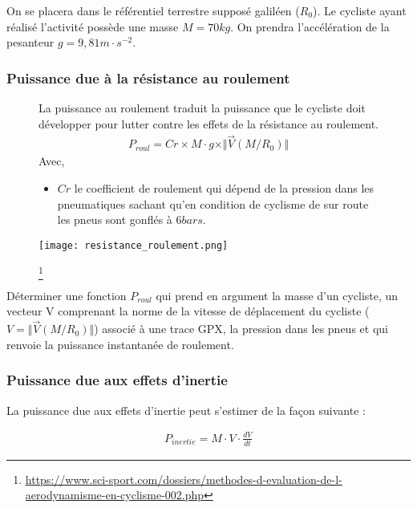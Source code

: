 On se placera dans le référentiel terrestre supposé galiléen ($R_0$). Le cycliste ayant réalisé l'activité possède une masse $M=70kg$. On prendra l'accélération de la pesanteur $g=9,81m\cdot s^{-2}$.

\subsubsection*{Puissance due à la résistance au roulement}

\begin{figure}[!htb]
\begin{minipage}{0.5\textwidth}
La puissance au roulement traduit la puissance que le cycliste doit développer pour lutter contre les effets de la résistance au roulement.
\begin{align*}
P_{roul}=Cr\times M\cdot g\times \Vert \overrightarrow{V}(M/R_0)\Vert
\end{align*}
Avec,
\begin{itemize}
\item $Cr$ le coefficient de roulement qui dépend de la pression dans les pneumatiques sachant qu'en condition de cyclisme de sur route les pneus sont gonflés à $6bars$.
\end{itemize}
\end{minipage}
\begin{minipage}{0.5\textwidth}
\begin{center}
\texttt{[image: resistance\_roulement.png]}
\caption{\label{res_roul}}
\footnote{\url{https://www.sci-sport.com/dossiers/methodes-d-evaluation-de-l-aerodynamisme-en-cyclisme-002.php}} 
\end{center}
\end{minipage}
\end{figure}

\question{} Déterminer une fonction $P_{roul}$ qui prend en argument la masse d'un cycliste, un vecteur V comprenant la norme de la vitesse de déplacement du cycliste ($V=\Vert \overrightarrow{V}(M/R_0)\Vert$) associé à une trace GPX, la pression dans les pneus et qui renvoie la puissance instantanée de roulement.

\subsubsection*{Puissance due aux effets d'inertie}

La puissance due aux effets d'inertie peut s'estimer de la façon suivante : 

\begin{align*}
P_{inertie}=M\cdot V\cdot \frac{dV}{dt}
\end{align*}

